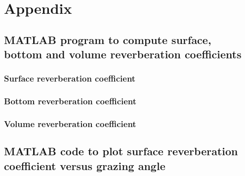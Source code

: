 
\chapter{Appendix} \label{Appendix}

\section{ MATLAB program to compute surface, bottom and volume reverberation coefficients } \label{ MATLAB program to compute surface, bottom and volume reverberation coefficients } 
\subsection{ Surface reverberation coefficient } \label{ Surface reverberation coefficient } 


\subsection{ Bottom reverberation coefficient } \label{ Bottom reverberation coefficient } 


\subsection{ Volume reverberation coefficient } \label{ Volume reverberation coefficient } 


\newpage

\section{ MATLAB code to plot surface reverberation coefficient versus grazing angle } \label{ MATLAB code to plot Surface reverberation coefficient versus grazing angle }

